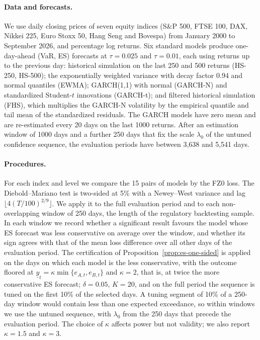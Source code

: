 \paragraph{Data and forecasts.}
We use daily closing prices of seven equity indices (S\&P 500, FTSE 100,
DAX, Nikkei 225, Euro Stoxx 50, Hang Seng and Bovespa) from January 2000 to
September 2026, and percentage log returns. Six standard models produce
one-day-ahead (VaR, ES) forecasts at $\tau=0.025$ and $\tau=0.01$, each
using returns up to the previous day: historical simulation on the last 250
and 500 returns (HS-250, HS-500); the exponentially weighted variance with
decay factor 0.94 and normal quantiles (EWMA); GARCH(1,1) with normal (GARCH-N)
and standardized Student-$t$ innovations (GARCH-t); and filtered historical
simulation (FHS), which multiplies the GARCH-N volatility by the empirical
quantile and tail mean of the standardized residuals. The GARCH models have
zero mean and are re-estimated every 20 days on the last 1000 returns. After
an estimation window of 1000 days and a further 250 days that fix the
scale $\lambda_0$ of the untuned confidence sequence, the evaluation
periods have between 3{,}638 and 5{,}541 days.

\paragraph{Procedures.}
For each index and level we compare the 15 pairs of models by the FZ0 loss.
The Diebold--Mariano test is two-sided at 5\% with a Newey--West variance
and lag $\lfloor4(T/100)^{2/9}\rfloor$. We apply it to the full evaluation
period and to each non-overlapping window of 250 days, the length of the
regulatory backtesting sample. In each window we record whether a
significant result favours the model whose ES forecast was less
conservative on average over the window, and whether its sign agrees with
that of the mean loss difference over all other days of the evaluation
period. The certification of Proposition~\ref{prop:es-one-sided} is applied
on the days on which each model is the less conservative, with the outcome
floored at $\underline y_t=\kappa\min\{e_{A,t},e_{B,t}\}$ and $\kappa=2$,
that is, at twice the more conservative ES forecast; $\delta=0.05$, $K=20$,
and on the full period the sequence is tuned on the first 10\% of the
selected days. A tuning segment of 10\% of a 250-day window would contain
less than one expected exceedance, so within windows we use the untuned
sequence, with $\lambda_0$ from the 250 days that precede the evaluation
period. The choice of $\kappa$ affects power but not validity; we also
report $\kappa=1.5$ and $\kappa=3$.


